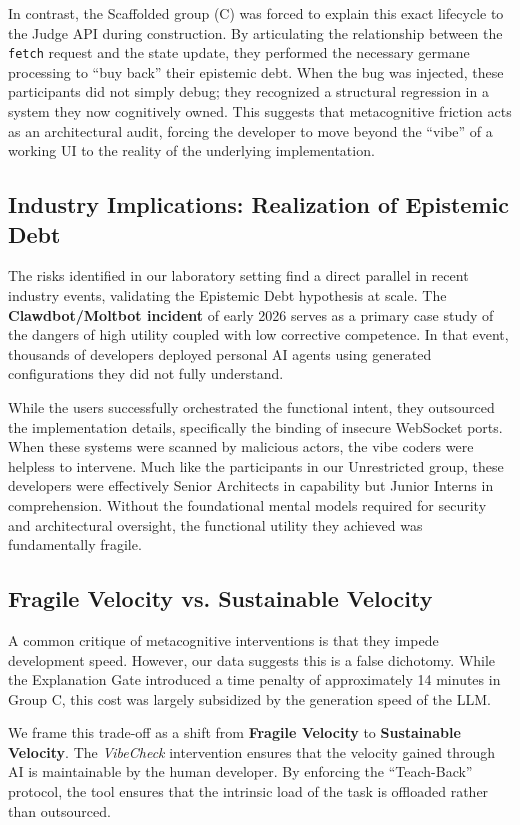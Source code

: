 \documentclass[sigconf]{acmart}
\begin{document}
In contrast, the Scaffolded group (C) was forced to explain this exact lifecycle to the Judge API during construction. By articulating the relationship between the \texttt{fetch} request and the state update, they performed the necessary germane processing to ``buy back'' their epistemic debt. When the bug was injected, these participants did not simply debug; they recognized a structural regression in a system they now cognitively owned. This suggests that metacognitive friction acts as an architectural audit, forcing the developer to move beyond the ``vibe'' of a working UI to the reality of the underlying implementation.

\subsection{Industry Implications: Realization of Epistemic Debt}
The risks identified in our laboratory setting find a direct parallel in recent industry events, validating the Epistemic Debt hypothesis at scale. The \textbf{Clawdbot/Moltbot incident} of early 2026 \cite{reuters2026moltbot} serves as a primary case study of the dangers of high utility coupled with low corrective competence. In that event, thousands of developers deployed personal AI agents using generated configurations they did not fully understand. 

While the users successfully orchestrated the functional intent, they outsourced the implementation details, specifically the binding of insecure WebSocket ports. When these systems were scanned by malicious actors, the vibe coders were helpless to intervene. Much like the participants in our Unrestricted group, these developers were effectively Senior Architects in capability but Junior Interns in comprehension. Without the foundational mental models required for security and architectural oversight, the functional utility they achieved was fundamentally fragile.

\subsection{Fragile Velocity vs. Sustainable Velocity}
A common critique of metacognitive interventions is that they impede development speed. However, our data suggests this is a false dichotomy. While the Explanation Gate introduced a time penalty of approximately 14 minutes in Group C, this cost was largely subsidized by the generation speed of the LLM. 

We frame this trade-off as a shift from \textbf{Fragile Velocity} to \textbf{Sustainable Velocity}. The \textit{VibeCheck} intervention ensures that the velocity gained through AI is maintainable by the human developer. By enforcing the ``Teach-Back'' protocol, the tool ensures that the intrinsic load of the task is offloaded rather than outsourced.
\end{document}
